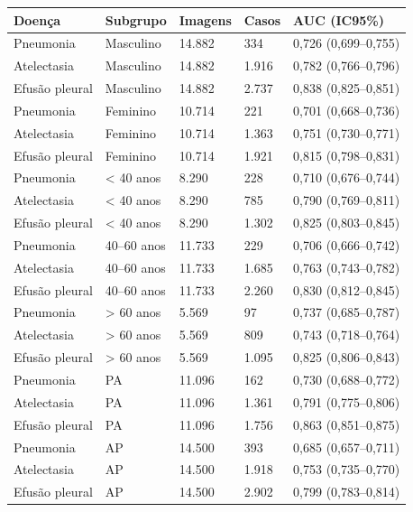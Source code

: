 \begin{tabular}{lllll}
\toprule
Doença & Subgrupo & Imagens & Casos & AUC (IC95\%) \\
\midrule
Pneumonia & Masculino & 14.882 & 334 & 0,726 (0,699–0,755) \\
Atelectasia & Masculino & 14.882 & 1.916 & 0,782 (0,766–0,796) \\
Efusão pleural & Masculino & 14.882 & 2.737 & 0,838 (0,825–0,851) \\
Pneumonia & Feminino & 10.714 & 221 & 0,701 (0,668–0,736) \\
Atelectasia & Feminino & 10.714 & 1.363 & 0,751 (0,730–0,771) \\
Efusão pleural & Feminino & 10.714 & 1.921 & 0,815 (0,798–0,831) \\
Pneumonia & < 40 anos & 8.290 & 228 & 0,710 (0,676–0,744) \\
Atelectasia & < 40 anos & 8.290 & 785 & 0,790 (0,769–0,811) \\
Efusão pleural & < 40 anos & 8.290 & 1.302 & 0,825 (0,803–0,845) \\
Pneumonia & 40–60 anos & 11.733 & 229 & 0,706 (0,666–0,742) \\
Atelectasia & 40–60 anos & 11.733 & 1.685 & 0,763 (0,743–0,782) \\
Efusão pleural & 40–60 anos & 11.733 & 2.260 & 0,830 (0,812–0,845) \\
Pneumonia & > 60 anos & 5.569 & 97 & 0,737 (0,685–0,787) \\
Atelectasia & > 60 anos & 5.569 & 809 & 0,743 (0,718–0,764) \\
Efusão pleural & > 60 anos & 5.569 & 1.095 & 0,825 (0,806–0,843) \\
Pneumonia & PA & 11.096 & 162 & 0,730 (0,688–0,772) \\
Atelectasia & PA & 11.096 & 1.361 & 0,791 (0,775–0,806) \\
Efusão pleural & PA & 11.096 & 1.756 & 0,863 (0,851–0,875) \\
Pneumonia & AP & 14.500 & 393 & 0,685 (0,657–0,711) \\
Atelectasia & AP & 14.500 & 1.918 & 0,753 (0,735–0,770) \\
Efusão pleural & AP & 14.500 & 2.902 & 0,799 (0,783–0,814) \\
\bottomrule
\end{tabular}
